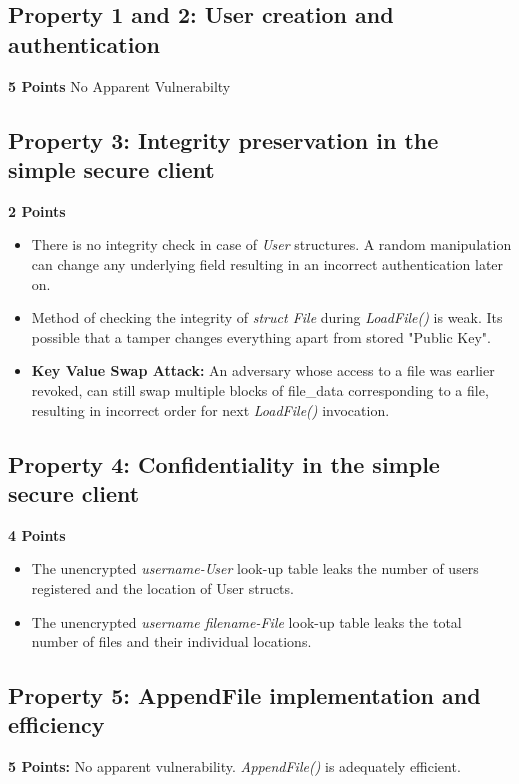\documentclass[12pt]{article}
\begin{document}
\subsection*{Property 1 and 2: User creation and authentication}
\textbf{5 Points} No Apparent Vulnerabilty

\subsection*{Property 3: Integrity preservation in the simple secure client}
\textbf{2 Points}

\begin{itemize}[wide=0pt, noitemsep]
	\itemsep0em
	\item There is no integrity check in case of \textit{User} structures. A random manipulation can change any underlying field resulting in an incorrect authentication later on.
	\item Method of checking the integrity of \textit{struct File} during \textit{LoadFile()} is weak. Its possible that a tamper changes everything apart from stored "Public Key".
	\item \textbf{Key Value Swap Attack:} An adversary whose access to a file was earlier revoked, can still swap multiple blocks of file\_data corresponding to a file, resulting in incorrect order for next \textit{LoadFile()} invocation.
\end{itemize}

\subsection*{Property 4: Confidentiality in the simple secure client}
\textbf{4 Points}

\begin{itemize}[wide=0pt, noitemsep]
	\itemsep0em
	\item The unencrypted \textit{username-User} look-up table leaks the number of users registered and the location of User structs.
	\item The unencrypted \textit{username filename-File} look-up table leaks the total number of files and their individual locations.
\end{itemize}

\subsection*{Property 5: AppendFile implementation and efficiency}
\textbf{5 Points:} No apparent vulnerability. \textit{AppendFile()} is adequately efficient.
\end{document}
